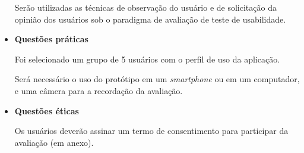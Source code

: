 \begin{itemize}
	      \subitem 
		Serão utilizadas as técnicas de observação do usuário e de solicitação da opinião dos usuários
		sob o paradigma de avaliação de teste de usabilidade.
	      
	   \item \textbf{Questões práticas}
	      
	      \subitem Foi selecionado um grupo de 5 usuários com o perfil de uso da aplicação.
	      
	      \subitem Será necessário o uso do protótipo em um \textit{smartphone} ou em um computador, e uma câmera para 
	      a recordação da avaliação.
	      
	   \item \textbf{Questões éticas}
	      
	      \subitem 
		Os usuários deverão assinar um termo de consentimento para participar da avaliação (em anexo).
	      
	  \end{itemize}
	
	